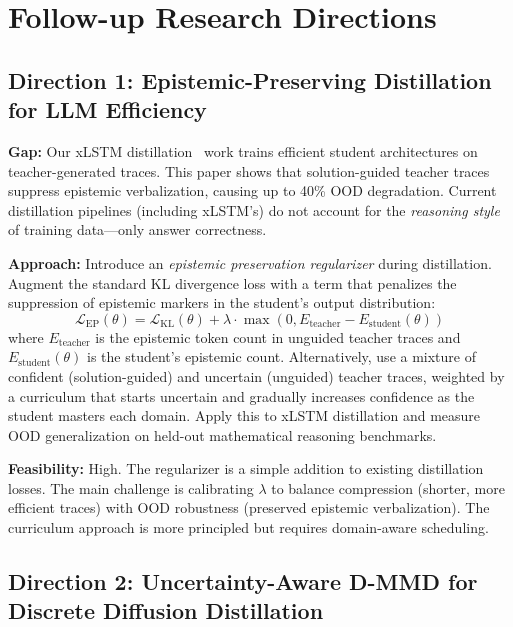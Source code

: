 \documentclass[11pt]{article}
\begin{document}
\section{Follow-up Research Directions}

\subsection{Direction 1: Epistemic-Preserving Distillation for LLM Efficiency}

\textbf{Gap:} Our xLSTM distillation~\cite{xlstm} work trains efficient student architectures on teacher-generated traces. This paper shows that solution-guided teacher traces suppress epistemic verbalization, causing up to 40\% OOD degradation. Current distillation pipelines (including xLSTM's) do not account for the \textit{reasoning style} of training data---only answer correctness.

\textbf{Approach:} Introduce an \textit{epistemic preservation regularizer} during distillation. Augment the standard KL divergence loss with a term that penalizes the suppression of epistemic markers in the student's output distribution:
\begin{equation}
\mathcal{L}_{\mathrm{EP}}(\theta) = \mathcal{L}_{\mathrm{KL}}(\theta) + \lambda \cdot \max\!\left(0, E_{\mathrm{teacher}} - E_{\mathrm{student}}(\theta)\right)
\end{equation}
where $E_{\mathrm{teacher}}$ is the epistemic token count in unguided teacher traces and $E_{\mathrm{student}}(\theta)$ is the student's epistemic count. Alternatively, use a mixture of confident (solution-guided) and uncertain (unguided) teacher traces, weighted by a curriculum that starts uncertain and gradually increases confidence as the student masters each domain. Apply this to xLSTM distillation and measure OOD generalization on held-out mathematical reasoning benchmarks.

\textbf{Feasibility:} High. The regularizer is a simple addition to existing distillation losses. The main challenge is calibrating $\lambda$ to balance compression (shorter, more efficient traces) with OOD robustness (preserved epistemic verbalization). The curriculum approach is more principled but requires domain-aware scheduling.

\subsection{Direction 2: Uncertainty-Aware D-MMD for Discrete Diffusion Distillation}
\end{document}
